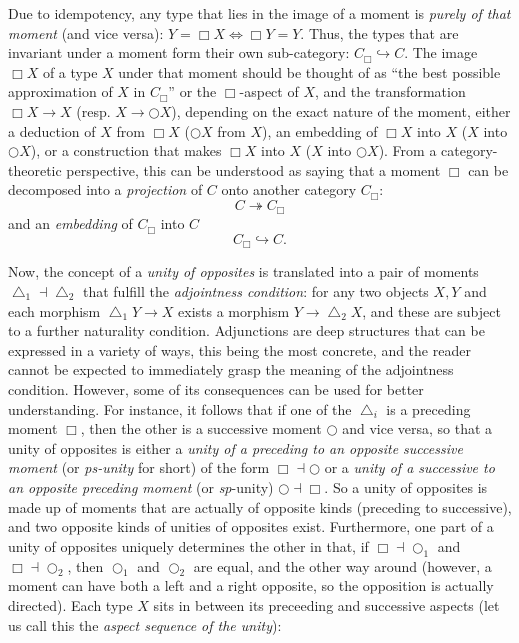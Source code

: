 \documentclass{article}
\begin{document}
Due to idempotency, any type that lies in the image of a moment is \emph{purely of that moment} (and vice versa): $Y=\Box X \Leftrightarrow \Box Y =Y$. Thus, the types that are invariant under a moment form their own sub-category: $C_\Box\hookrightarrow C$. The image $\Box X $ of a type $X$ under that moment should be thought of as ``the best possible approximation of $X$ in $C_\Box$'' or the $\Box$-aspect of $X$, and the transformation $\Box X \rightarrow X$ (resp. $X\rightarrow \bigcirc X$), depending on the exact nature of the moment, either a deduction of $X$ from $\Box  X $ ($\bigcirc X $ from $X$), an embedding of $\Box X $ into $X$ ($X$ into 
$\bigcirc X$), or a construction that makes $\Box X$ into $X$ ($X$ into $\bigcirc X$). From a category-theoretic perspective, this can be understood as saying that a moment $\Box$ can be decomposed into a \emph{projection} of $C$ onto another category $C_\Box:$
$$C\twoheadrightarrow C_\Box$$
and an \emph{embedding} of $C_\Box$ into $C$ $$C_\Box\hookrightarrow C.$$

Now, the concept of a \emph{unity of opposites} is translated into a pair of moments $\bigtriangleup_1\dashv\bigtriangleup_2$ that fulfill the \emph{adjointness condition}: for any two objects $X,Y$ and each morphism $\bigtriangleup_1 Y\rightarrow X$ exists a morphism $Y\rightarrow \bigtriangleup_2 X$, and these are subject to a further naturality condition. Adjunctions are deep structures that can be expressed in a variety of ways, this being the most concrete, and the reader cannot be expected to immediately grasp the meaning of the adjointness condition. However, some of its consequences can be used for better understanding. For instance, it follows that if one of the $\bigtriangleup_i$ is a preceding moment $\Box$, then the other is a successive moment $\bigcirc$ and vice versa, so that a unity of opposites is either a \emph{unity of a preceding to an opposite successive moment} (or \emph{ps-unity} for  short) of the form $\Box\dashv\bigcirc$ or a \emph{unity of a successive to an opposite preceding moment} (or \emph{sp}-unity) $\bigcirc\dashv\Box$. So a unity of opposites is made up of moments that are actually of opposite kinds (preceding to successive), and two opposite kinds of unities of opposites exist. Furthermore, one part of a unity of opposites uniquely determines the other in that, if $\Box\dashv\bigcirc_1$ and $\Box\dashv\bigcirc_2$, then $\bigcirc_1$ and $\bigcirc_2$ are equal, and the other way around (however, a moment can have both a left and a right opposite, so the opposition is actually directed). Each type $X$ sits in between its preceeding and successive aspects (let us call this the \emph{aspect sequence of the unity}): 
\end{document}
